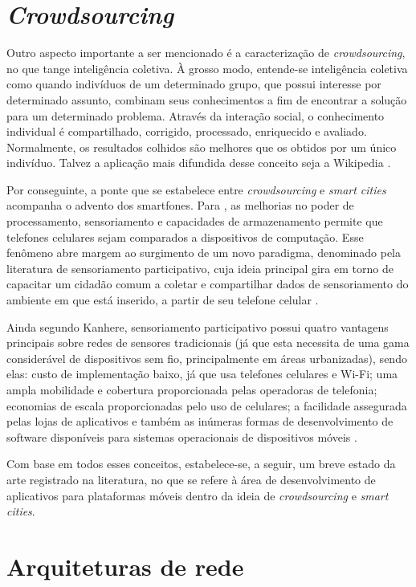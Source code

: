 \section{\textit{Crowdsourcing}}

Outro aspecto importante  a ser mencionado é a caracterização de \emph{crowdsourcing}, no que tange inteligência coletiva. À grosso modo, entende-se inteligência coletiva como quando indivíduos de um determinado grupo, que possui interesse por determinado assunto, combinam seus conhecimentos a fim de encontrar a solução para um determinado problema.  Através da interação social, o conhecimento individual é compartilhado, corrigido, processado, enriquecido e avaliado. Normalmente, os resultados colhidos são melhores que os obtidos por um único indivíduo. Talvez a aplicação mais difundida desse conceito seja a Wikipedia  \cite{schuurman}. 

Por conseguinte, a ponte que se estabelece entre \emph{crowdsourcing} e \emph{smart cities} acompanha o advento dos smartfones. Para , as melhorias no poder de processamento, sensoriamento e capacidades de armazenamento permite que telefones celulares sejam comparados a dispositivos de computação. Esse fenômeno abre margem ao surgimento de um novo paradigma, denominado pela literatura de sensoriamento participativo, cuja ideia principal gira em torno de capacitar um cidadão comum a coletar e compartilhar dados de sensoriamento do ambiente em que está inserido, a partir de seu telefone celular \cite{kanhere}.

Ainda segundo Kanhere, sensoriamento participativo possui quatro vantagens principais sobre redes de sensores tradicionais (já que esta necessita de uma gama considerável de dispositivos sem fio, principalmente em áreas urbanizadas), sendo elas: custo de implementação baixo, já que usa telefones celulares e Wi-Fi; uma ampla mobilidade e cobertura proporcionada pelas operadoras de telefonia; economias de escala proporcionadas pelo uso de celulares; a facilidade assegurada pelas lojas de aplicativos e também as inúmeras formas de desenvolvimento de software disponíveis para sistemas operacionais de dispositivos móveis \cite{kanhere}. 

Com base em todos esses conceitos, estabelece-se, a seguir, um breve estado da arte registrado na literatura, no que se refere à área de desenvolvimento de aplicativos para plataformas móveis dentro da ideia de \emph{crowdsourcing} e \emph{smart cities}.

\section{Arquiteturas de rede}

